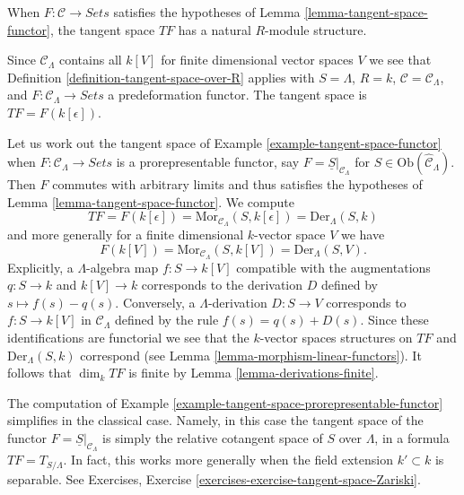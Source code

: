 \noindent
When $F : \mathcal{C} \to \textit{Sets}$ satisfies the hypotheses of
Lemma \ref{lemma-tangent-space-functor},
the tangent space $TF$ has a natural $R$-module structure.

\begin{example}
\label{example-tangent-space-functor}
Since $\mathcal{C}_\Lambda$ contains all $k[V]$ for finite dimensional
vector spaces $V$ we see that
Definition \ref{definition-tangent-space-over-R} applies with
$S = \Lambda$, $R = k$, $\mathcal{C} = \mathcal{C}_\Lambda$, and
$F : \mathcal{C}_\Lambda \to \textit{Sets}$ a
predeformation functor. The tangent space is $TF = F(k[\epsilon])$.
\end{example}

\begin{example}
\label{example-tangent-space-prorepresentable-functor}
Let us work out the tangent space of
Example \ref{example-tangent-space-functor}
when $F : \mathcal{C}_\Lambda \to \textit{Sets}$ is a 
prorepresentable functor, say $F = \underline{S}|_{\mathcal{C}_\Lambda}$ 
for $S \in \text{Ob}(\widehat{\mathcal{C}}_\Lambda)$. Then $F$ commutes 
with arbitrary limits and thus satisfies the hypotheses of
Lemma \ref{lemma-tangent-space-functor}.
We compute
$$
TF = F(k[\epsilon]) = \text{Mor}_{\mathcal{C}_\Lambda}(S, k[\epsilon])
= \text{Der}_\Lambda(S, k)
$$
and more generally for a finite dimensional $k$-vector space $V$ we have
$$
F(k[V]) = \text{Mor}_{\mathcal{C}_\Lambda}(S, k[V]) = \text{Der}_\Lambda(S, V).
$$
Explicitly, a $\Lambda$-algebra map $f : S \to k[V]$ compatible with
the augmentations $q : S \to k$ and $k[V] \to k$ corresponds to the derivation
$D$ defined by $s \mapsto f(s) - q(s)$. Conversely, a
$\Lambda$-derivation $D : S \to V$ corresponds to $f : S \to k[V]$
in $\mathcal{C}_\Lambda$ defined by the rule $f(s) = q(s) + D(s)$. Since
these identifications are functorial we see that the $k$-vector spaces
structures on $TF$ and $\text{Der}_\Lambda(S, k)$ correspond (see
Lemma \ref{lemma-morphism-linear-functors}).
It follows that $\dim_k TF$ is finite by
Lemma \ref{lemma-derivations-finite}.
\end{example}

\begin{example}
\label{example-tangent-space-classical-prorepresentable-functor}
The computation of
Example \ref{example-tangent-space-prorepresentable-functor}
simplifies in the classical case. Namely, in this case
the tangent space of the functor
$F = \underline{S}|_{\mathcal{C}_\Lambda}$ is simply the
relative cotangent space of $S$ over $\Lambda$, in a formula
$TF = T_{S/\Lambda}$. In fact, this works more generally when the
field extension $k' \subset k$ is separable. See
Exercises, Exercise \ref{exercises-exercise-tangent-space-Zariski}.
\end{example}


